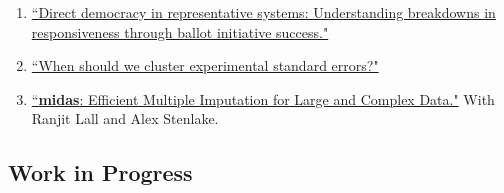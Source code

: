 \documentclass[11pt, a4paper]{article}
\begin{document}
\begin{enumerate}

\item \href{https://ts-robinson.com/files/tsr_ballot_initiatives_confirmation.pdf}{``Direct democracy in representative systems: Understanding breakdowns in responsiveness through ballot initiative success."} 


\item \href{https://ts-robinson.com/files/standard_errors_tsr.pdf}{``When should we cluster experimental standard errors?" }

\item \href{https://ts-robinson.com/files/MIDAS_technical.pdf}{``\textbf{midas}: Efficient Multiple Imputation for Large and Complex Data."} With Ranjit Lall and Alex Stenlake.

\end{enumerate}


\subsection*{Work in Progress}
\end{document}
